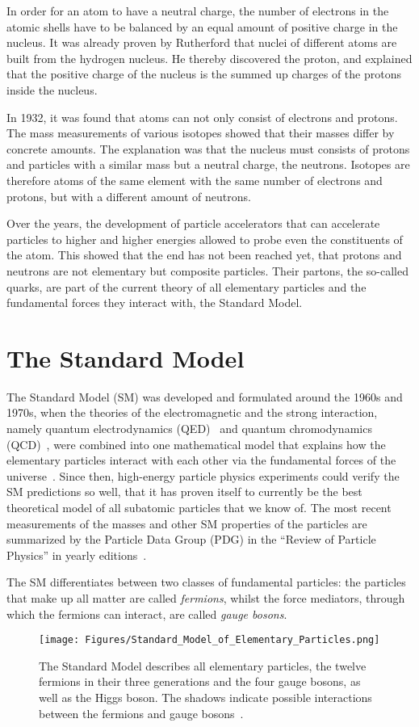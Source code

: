 In order for an atom to have a neutral charge, the number of electrons in the atomic shells have to be balanced by an equal amount of positive charge in the nucleus.
It was already proven by Rutherford that nuclei of different atoms are built from the hydrogen nucleus.
He thereby discovered the proton, and explained that the positive charge of the nucleus is the summed up charges of the protons inside the nucleus.

In 1932, it was found that atoms can not only consist of electrons and protons.~\cite[p. 15]{Griffiths}
The mass measurements of various isotopes showed that their masses differ by concrete amounts.
The explanation was that the nucleus must consists of protons and particles with a similar mass but a neutral charge, the neutrons.
Isotopes are therefore atoms of the same element with the same number of electrons and protons, but with a different amount of neutrons.

Over the years, the development of particle accelerators that can accelerate particles to higher and higher energies allowed to probe even the constituents of the atom.
This showed that the end has not been reached yet, that protons and neutrons are not elementary but composite particles.
Their partons, the so-called quarks, are part of the current theory of all elementary particles and the fundamental forces they interact with, the Standard Model.

\section{The Standard Model}
\label{StandardModel}
The Standard Model (SM) was developed and formulated around the 1960s and 1970s, when the theories of the electromagnetic and the strong interaction, namely quantum electrodynamics (QED)~\cite{QED,QED2,QED3} and quantum chromodynamics (QCD)~\cite{QCD,QCD2}, were combined into one mathematical model that explains how the elementary particles interact with each other via the fundamental forces of the universe~\cite[p. 3]{Griffiths}.
Since then, high-energy particle physics experiments could verify the SM predictions so well, that it has proven itself to currently be the best theoretical model of all subatomic particles that we know of.
The most recent measurements of the masses and other SM properties of the particles are summarized by the Particle Data Group (PDG) in the ``Review of Particle Physics'' in yearly editions~\cite{PDG}.

The SM differentiates between two classes of fundamental particles: 
the particles that make up all matter are called \textit{fermions}, whilst the force mediators, through which the fermions can interact, are called \textit{gauge bosons}.
\begin{figure}[htbp]
\centering
\texttt{[image: Figures/Standard\_Model\_of\_Elementary\_Particles.png]}
\caption[Standard Model]{The Standard Model describes all elementary particles, the twelve fermions in their three generations and the four gauge bosons, as well as the Higgs boson.
The shadows indicate possible interactions between the fermions and gauge bosons~\cite{SM}.}
\label{fig:SM}
\end{figure}

